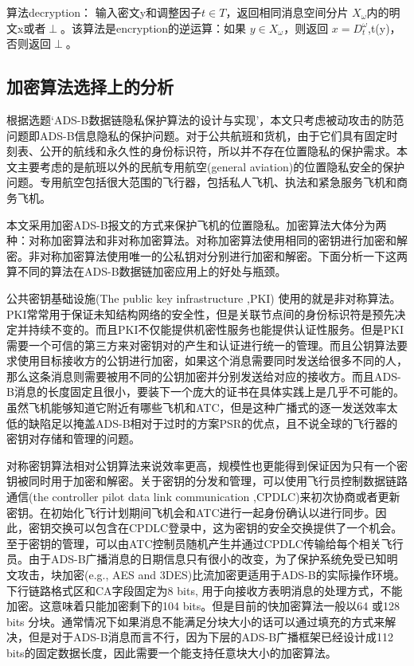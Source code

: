 算法decryption： 
输入密文y和调整因子$t \in T$，返回相同消息空间分片 $X_\omega$内的明文x或者$\perp$。该算法是encryption的逆运算：如果 $y \in X_\omega$，则返回
$x=D_t^\omega$,t(y)，否则返回$\perp$。

\subsection{加密算法选择上的分析}
根据选题‘ADS-B数据链隐私保护算法的设计与实现’，本文只考虑被动攻击的防范问题即ADS-B信息隐私的保护问题。对于公共航班和货机，由于它们具有固定时刻表、公开的航线和永久性的身份标识符，所以并不存在位置隐私的保护需求。本文主要考虑的是航班以外的民航专用航空(general aviation)的位置隐私安全的保护问题。专用航空包括很大范围的飞行器，包括私人飞机、执法和紧急服务飞机和商务飞机。

本文采用加密ADS-B报文的方式来保护飞机的位置隐私。加密算法大体分为两种：对称加密算法和非对称加密算法。对称加密算法使用相同的密钥进行加密和解密。非对称加密算法使用唯一的公私钥对分别进行加密和解密。下面分析一下这两算不同的算法在ADS-B数据链加密应用上的好处与瓶颈。

公共密钥基础设施(The public key infrastructure ,PKI) 使用的就是非对称算法。PKI常常用于保证未知结构网络的安全性，但是关联节点间的身份标识符是预先决定并持续不变的。而且PKI不仅能提供机密性服务也能提供认证性服务。但是PKI需要一个可信的第三方来对密钥对的产生和认证进行统一的管理。而且公钥算法要求使用目标接收方的公钥进行加密，如果这个消息需要同时发送给很多不同的人，那么这条消息则需要被用不同的公钥加密并分别发送给对应的接收方。而且ADS-B消息的长度固定且很小，要装下一个庞大的证书在具体实践上是几乎不可能的。虽然飞机能够知道它附近有哪些飞机和ATC，但是这种广播式的逐一发送效率太低的缺陷足以掩盖ADS-B相对于过时的方案PSR的优点，且不说全球的飞行器的密钥对存储和管理的问题。

对称密钥算法相对公钥算法来说效率更高，规模性也更能得到保证因为只有一个密钥被同时用于加密和解密。关于密钥的分发和管理，可以使用飞行员控制数据链路通信(the controller pilot data link communication ,CPDLC)来初次协商或者更新密钥。在初始化飞行计划期间飞机会和ATC进行一起身份确认以进行同步。因此，密钥交换可以包含在CPDLC登录中，这为密钥的安全交换提供了一个机会。至于密钥的管理，可以由ATC控制员随机产生并通过CPDLC传输给每个相关飞行员。由于ADS-B广播消息的日期信息只有很小的改变，为了保护系统免受已知明文攻击，块加密(e.g., AES and 3DES)比流加密更适用于ADS-B的实际操作环境。下行链路格式区和CA字段固定为8 bits, 用于向接收方表明消息的处理方式，不能加密。这意味着只能加密剩下的104 bits。但是目前的快加密算法一般以64 或128 bits 分块。通常情况下如果消息不能满足分块大小的话可以通过填充的方式来解决，但是对于ADS-B消息而言不行，因为下层的ADS-B广播框架已经设计成112 bits的固定数据长度，因此需要一个能支持任意块大小的加密算法。

